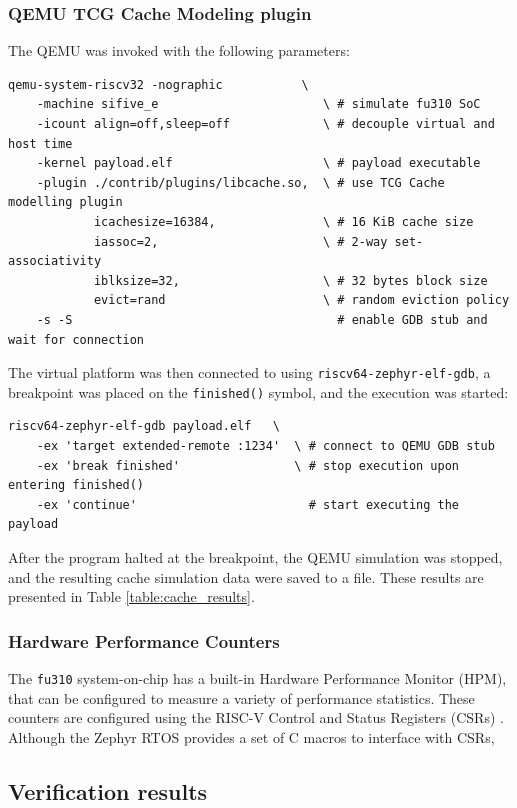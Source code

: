 \subsubsection{QEMU TCG Cache Modeling plugin}
The QEMU was invoked with the following parameters:
\begin{verbatim}
qemu-system-riscv32 -nographic           \
	-machine sifive_e                       \ # simulate fu310 SoC
	-icount align=off,sleep=off             \ # decouple virtual and host time
	-kernel payload.elf                     \ # payload executable
	-plugin ./contrib/plugins/libcache.so,  \ # use TCG Cache modelling plugin
	        icachesize=16384,               \ # 16 KiB cache size
	        iassoc=2,                       \ # 2-way set-associativity
	        iblksize=32,                    \ # 32 bytes block size
	        evict=rand                      \ # random eviction policy
	-s -S                                     # enable GDB stub and wait for connection
\end{verbatim}

\noindent The virtual platform was then connected to using \texttt{riscv64-zephyr-elf-gdb}, a breakpoint was placed on the \texttt{finished()} symbol, and the execution was started:
\begin{verbatim}
riscv64-zephyr-elf-gdb payload.elf   \
	-ex 'target extended-remote :1234'  \ # connect to QEMU GDB stub
	-ex 'break finished'                \ # stop execution upon entering finished()
	-ex 'continue'                        # start executing the payload
\end{verbatim}

\noindent After the program halted at the breakpoint, the QEMU simulation was stopped, and the resulting cache simulation data were saved to a file. These results are presented in
Table \ref{table:cache_results}.


\subsubsection{Hardware Performance Counters}
The \texttt{fu310} system-on-chip has a built-in Hardware Performance Monitor (HPM), that can be configured to measure a variety of performance statistics. These counters are configured
using the RISC-V Control and Status Registers (CSRs) \cite{fe310docs, riscvisa}. Although the Zephyr RTOS provides a set of C macros to interface with CSRs, 


\subsection{Verification results}

